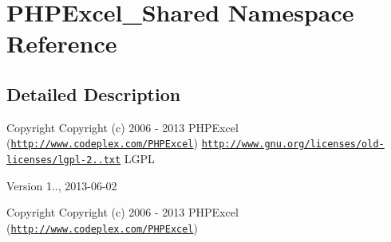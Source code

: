 \hypertarget{namespacePHPExcel__Shared}{}\section{P\+H\+P\+Excel\+\_\+\+Shared Namespace Reference}
\label{namespacePHPExcel__Shared}


\subsection{Detailed Description}
\begin{DoxyCopyright}{Copyright}
Copyright (c) 2006 -\/ 2013 P\+H\+P\+Excel (\href{http://www.codeplex.com/PHPExcel}{\tt http\+://www.\+codeplex.\+com/\+P\+H\+P\+Excel})  \href{http://www.gnu.org/licenses/old-licenses/lgpl-2.1.txt}{\tt http\+://www.\+gnu.\+org/licenses/old-\/licenses/lgpl-\/2..\+txt} L\+G\+PL 
\end{DoxyCopyright}
\begin{DoxyVersion}{Version}
1.., 2013-\/06-\/02
\end{DoxyVersion}
\begin{DoxyCopyright}{Copyright}
Copyright (c) 2006 -\/ 2013 P\+H\+P\+Excel (\href{http://www.codeplex.com/PHPExcel}{\tt http\+://www.\+codeplex.\+com/\+P\+H\+P\+Excel}) 
\end{DoxyCopyright}
